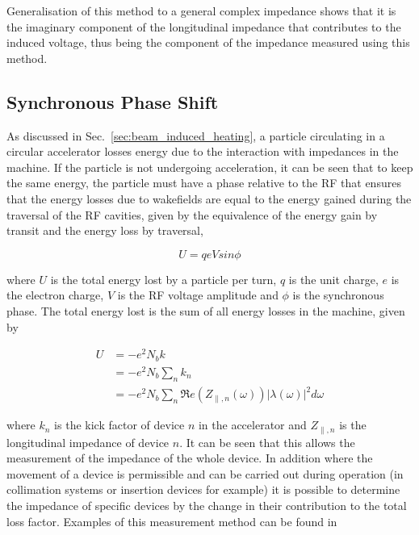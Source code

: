 Generalisation of this method to a general complex impedance shows that it is the imaginary component of the longitudinal impedance that contributes to the induced voltage, thus being the component of the impedance measured using this method.

\subsection{Synchronous Phase Shift}
\label{sec:syn-phase-shift}

As discussed in Sec.~\ref{sec:beam_induced_heating}, a particle circulating in a circular accelerator losses energy due to the interaction with impedances in the machine. If the particle is not undergoing acceleration, it can be seen that to keep the same energy, the particle must have a phase relative to the RF that ensures that the energy losses due to wakefields are equal to the energy gained during the traversal of the RF cavities, given by the equivalence of the energy gain by transit and the energy loss by traversal,

\begin{equation}
U = qeVsin\phi
\end{equation}

where $U$ is the total energy lost by a particle per turn, $q$ is the unit charge, $e$ is the electron charge, $V$ is the RF voltage amplitude and $\phi$ is the synchronous phase. The total energy lost is the sum of all energy losses in the machine, given by

\begin{align}
U & = -e^{2}N_{b}k \\
   & = -e^{2}N_{b}\displaystyle\sum\limits_{n} k_{n} \\
   & = -e^{2}N_{b}\displaystyle\sum\limits_{n} \Re{}e\left( Z_{\parallel,n}\left( \omega \right) \right)\left| \lambda \left( \omega \right) \right|^{2} d\omega
\end{align}

where $k_{n}$ is the kick factor of device $n$ in the accelerator and $ Z_{\parallel,n}$ is the longitudinal impedance of device $n$. It can be seen that this allows the measurement of the impedance of the whole device. In addition where the movement of a device is permissible and can be carried out during operation (in collimation systems or insertion devices for example) it is possible to determine the impedance of specific devices by the change in their contribution to the total loss factor. Examples of this measurement method can be found in \cite{Bohl:SingleBunchEnLoss, Argyropoulos:longImpInj}

